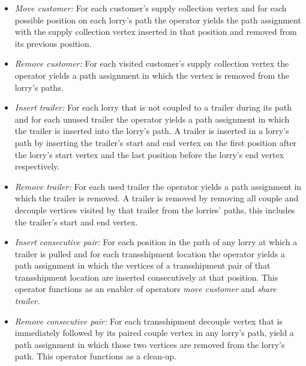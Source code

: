 \begin{itemize}
	\item \textit{Move customer:} For each customer's supply collection vertex and  for each possible position on each lorry's path the operator yields the path assignment with the supply collection vertex inserted in that position and  removed from its previous position.
	\item \textit{Remove customer:} For each visited customer's supply collection vertex the operator yields a path assignment in which the vertex is removed from the lorry's paths.

  \item \textit{Insert trailer:} For each lorry that is not coupled to a trailer during its path and for each unused trailer the operator  yields a path assignment in which the trailer is inserted into the lorry's path. A trailer is inserted in a lorry's path by inserting the trailer's start and end vertex on the first position after the lorry's start vertex and the last position before the lorry's end vertex respectively.

	\item \textit{Remove trailer:} For each used trailer the operator yields a path assignment in which the trailer is removed. A trailer is removed by removing all couple and decouple vertices visited by that trailer from  the lorries' paths, this includes the trailer's start and end vertex.

  \item \textit{Insert consecutive pair:} For each position in the path of any lorry at which a trailer is pulled and for each transshipment location the operator yields a path assignment in which the vertices of a transshipment pair of that transshipment location are inserted consecutively at that position. This operator functions as an enabler of operators \textit{move customer} and  \textit{share trailer}.

	\item \textit{Remove consecutive pair:} For each transshipment decouple vertex that is immediately followed by its paired couple vertex in any lorry's path, yield a path assignment in which those two vertices are removed from the lorry's path. This operator functions as a clean-up.


\end{itemize}
